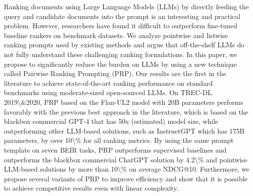 Ranking documents using Large Language Models (LLMs) by directly feeding the query and candidate documents into the prompt is an interesting and practical problem. However,  researchers have found it difficult to outperform fine-tuned baseline rankers on benchmark datasets. We analyze pointwise and listwise ranking prompts used by existing methods and argue that off-the-shelf LLMs do not fully understand these challenging ranking formulations. In this paper, we propose to significantly reduce the burden on LLMs by using a new technique called Pairwise Ranking Prompting (PRP). Our results are the first in the literature to achieve state-of-the-art ranking performance on standard benchmarks using moderate-sized open-sourced LLMs. On TREC-DL 2019\textbackslash{}\&2020, PRP based on the Flan-UL2 model with 20B parameters performs favorably with the previous best approach in the literature, which is based on the blackbox commercial GPT-4 that has 50x (estimated) model size, while outperforming other LLM-based solutions, such as InstructGPT which has 175B parameters, by over 10\textbackslash{}\% for all ranking metrics. By using the same prompt template on seven BEIR tasks, PRP outperforms supervised baselines and outperforms the blackbox commercial ChatGPT solution by 4.2\textbackslash{}\% and pointwise LLM-based solutions by more than 10\textbackslash{}\% on average NDCG@10. Furthermore, we propose several variants of PRP to improve efficiency and show that it is possible to achieve competitive results even with linear complexity.